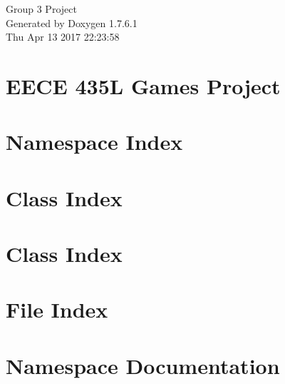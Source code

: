 \documentclass[a4paper]{book}
\begin{document}
\hypersetup{pageanchor=false,citecolor=blue}
\begin{titlepage}
\vspace*{7cm}
\begin{center}
{\Large \-Group 3 \-Project }\\
\vspace*{1cm}
{\large \-Generated by Doxygen 1.7.6.1}\\
\vspace*{0.5cm}
{\small Thu Apr 13 2017 22:23:58}\\
\end{center}
\end{titlepage}
\clearemptydoublepage
{}
\tableofcontents
\clearemptydoublepage
{}
\hypersetup{pageanchor=true,citecolor=blue}
\chapter{\-E\-E\-C\-E 435\-L \-Games \-Project}
\label{index}\hypertarget{index}{}
\chapter{\-Namespace \-Index}

\chapter{\-Class \-Index}

\chapter{\-Class \-Index}

\chapter{\-File \-Index}

\chapter{\-Namespace \-Documentation}

\end{document}
